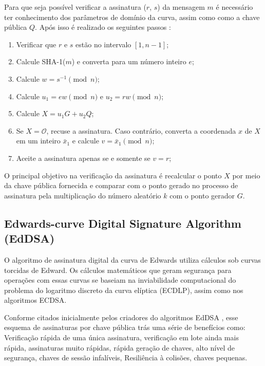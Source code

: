 Para que seja possível verificar a assinatura ($r$, $s$) da mensagem $m$ é necessário ter conhecimento dos parâmetros de domínio da curva, assim como como a chave pública $Q$. Após isso é realizado os seguintes passos \cite{johnson2001elliptic}:
\begin{enumerate}
    \item Verificar que $r$ e $s$ estão no intervalo $[1, n - 1]$;
    \item Calcule SHA-1($m$) e converta para um número inteiro $e$;
    \item Calcule $w = s^{-1} \pmod{n}$;
    \item Calcule $u_1 = ew \pmod{n}$ e $u_2 = rw \pmod{n}$;
    \item Calcule $X = u_1 G + u_2 Q$;
    \item Se $X = \mathcal{O}$, recuse a assinatura. Caso contrário, converta a coordenada $x$ de $X$ em um inteiro $\bar x_1$ e calcule $v = \bar x_1 \pmod{n}$;
    \item Aceite a assinatura apenas se e somente se $v = r$;
\end{enumerate}

O principal objetivo na verificação da assinatura é recalcular o ponto $X$ por meio da chave pública fornecida e comparar com o ponto gerado no processo de assinatura pela multiplicação do número aleatório $k$ com o ponto gerador $G$.  

\subsection{Edwards-curve Digital Signature Algorithm (EdDSA)}

O algoritmo de assinatura digital da curva de Edwards utiliza cálculos sob curvas torcidas de Edward. Os cálculos matemáticos que geram segurança para operações com essas curvas se baseiam na inviabilidade computacional do problema do logaritmo discreto da curva elíptica (ECDLP), assim como nos algoritmos ECDSA.

Conforme citados inicialmente pelos criadores do algoritmos EdDSA , esse esquema de assinaturas por chave pública trás uma série de benefícios como: Verificação rápida de uma única assinatura, verificação em lote ainda mais rápida, assinaturas muito rápidas, rápida geração de chaves, alto nível de segurança, chaves de sessão infalíveis, Resiliência à colisões, chaves pequenas.

